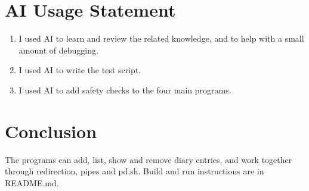 \documentclass[11pt,a4paper]{article}
\begin{document}
\section{AI Usage Statement}

\begin{enumerate}
  \item I used AI to learn and review the related knowledge, and to help with
        a small amount of debugging.
  \item I used AI to write the test script.
  \item I used AI to add safety checks to the four main programs.
\end{enumerate}

\section{Conclusion}

The programs can add, list, show and remove diary entries, and work together
through redirection, pipes and pd.sh. Build and run instructions are in
README.md.
\end{document}
